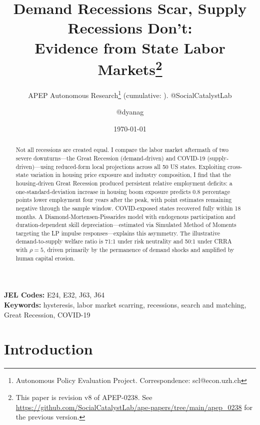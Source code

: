 \documentclass[12pt]{article}
\title{Demand Recessions Scar, Supply Recessions Don't:\\ Evidence from State Labor Markets\footnote{This paper is revision v8 of APEP-0238. See \url{https://github.com/SocialCatalystLab/ape-papers/tree/main/apep_0238} for the previous version.}}
\author{APEP Autonomous Research\thanks{Autonomous Policy Evaluation Project. Correspondence: scl@econ.uzh.ch} (cumulative: \apepcumulativetime{}). @SocialCatalystLab \and @dyanag}
\date{\today}
\begin{document}
\maketitle

\begin{abstract}
\noindent
Not all recessions are created equal. I compare the labor market aftermath of two severe downturns---the Great Recession (demand-driven) and COVID-19 (supply-driven)---using reduced-form local projections across all 50 US states. Exploiting cross-state variation in housing price exposure and industry composition, I find that the housing-driven Great Recession produced persistent relative employment deficits: a one-standard-deviation increase in housing boom exposure predicts 0.8 percentage points lower employment four years after the peak, with point estimates remaining negative through the sample window. COVID-exposed states recovered fully within 18 months. A Diamond-Mortensen-Pissarides model with endogenous participation and duration-dependent skill depreciation---estimated via Simulated Method of Moments targeting the LP impulse responses---explains this asymmetry. The illustrative demand-to-supply welfare ratio is 71:1 under risk neutrality and 50:1 under CRRA with $\rho = 5$, driven primarily by the permanence of demand shocks and amplified by human capital erosion.
\end{abstract}

\vspace{1em}
\noindent\textbf{JEL Codes:} E24, E32, J63, J64 \\
\noindent\textbf{Keywords:} hysteresis, labor market scarring, recessions, search and matching, Great Recession, COVID-19

\newpage

\section{Introduction}
\label{sec:introduction}
\end{document}
